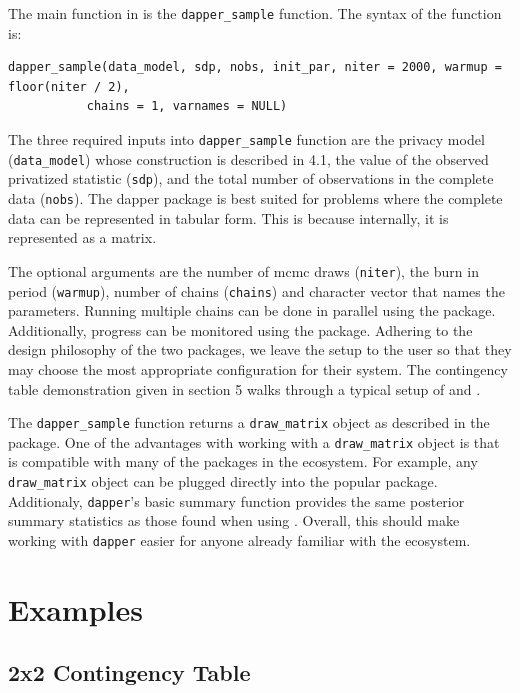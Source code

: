 The main function in  is the \texttt{dapper\_sample} function. The syntax of the function is:

\begin{verbatim}
dapper_sample(data_model, sdp, nobs, init_par, niter = 2000, warmup = floor(niter / 2),
           chains = 1, varnames = NULL)
\end{verbatim}

The three required inputs into \texttt{dapper\_sample} function are the privacy model (\texttt{data\_model}) whose construction is described in 4.1, the value
of the observed privatized statistic (\texttt{sdp}), and the total number of observations
in the complete data (\texttt{nobs}). The dapper
package is best suited for problems where the complete data can be represented in
tabular form. This is because internally, it is represented as a matrix.

The optional arguments are the number of mcmc draws (\texttt{niter}), the
burn in period (\texttt{warmup}), number of chains (\texttt{chains}) and character
vector that names the parameters. Running multiple chains can be done in parallel
using the  package. Additionally, progress can be monitored
using the  package. Adhering to the design philosophy
of the two packages, we leave the setup to the user so that they may
choose the most appropriate configuration for their system. The
contingency table demonstration given in section 5 walks
through a typical setup of  and .

The \texttt{dapper\_sample} function returns a \texttt{draw\_matrix} object as described
in the  package. One of the advantages with working
with a \texttt{draw\_matrix} object is that is compatible with many of the packages in
the  ecosystem. For example, any \texttt{draw\_matrix} object can be
plugged directly into the popular  package. Additionaly,
\texttt{dapper}'s basic summary function provides the same posterior summary statistics
as those found when using . Overall, this should make working with \texttt{dapper} easier
for anyone already familiar with the  ecosystem.

\hypertarget{examples}{%
\section{Examples}\label{examples}}

\hypertarget{x2-contingency-table}{%
\subsection{2x2 Contingency Table}\label{x2-contingency-table}}

